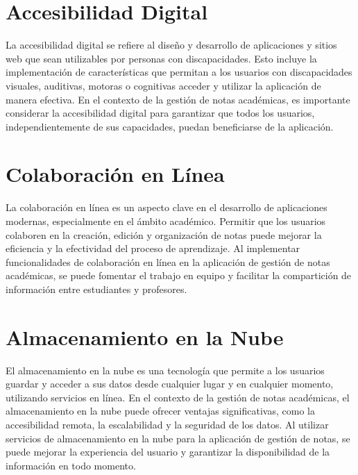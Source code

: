 \section{Accesibilidad Digital}
La accesibilidad digital se refiere al diseño y desarrollo de aplicaciones y sitios web que sean utilizables por personas con discapacidades. Esto incluye la implementación de características que permitan a los usuarios con discapacidades visuales, auditivas, motoras o cognitivas acceder y utilizar la aplicación de manera efectiva. En el contexto de la gestión de notas académicas, es importante considerar la accesibilidad digital para garantizar que todos los usuarios, independientemente de sus capacidades, puedan beneficiarse de la aplicación.\cite{porto_accesibilidad_2023}

\vspace{1cm}
\section{Colaboración en Línea}
La colaboración en línea es un aspecto clave en el desarrollo de aplicaciones modernas, especialmente en el ámbito académico. Permitir que los usuarios colaboren en la creación, edición y organización de notas puede mejorar la eficiencia y la efectividad del proceso de aprendizaje. Al implementar funcionalidades de colaboración en línea en la aplicación de gestión de notas académicas, se puede fomentar el trabajo en equipo y facilitar la compartición de información entre estudiantes y profesores.\cite{trabajo_colaborativo}    

\vspace{1cm}
\section{Almacenamiento en la Nube}
El almacenamiento en la nube es una tecnología que permite a los usuarios guardar y acceder a sus datos desde cualquier lugar y en cualquier momento, utilizando servicios en línea. En el contexto de la gestión de notas académicas, el almacenamiento en la nube puede ofrecer ventajas significativas, como la accesibilidad remota, la escalabilidad y la seguridad de los datos. Al utilizar servicios de almacenamiento en la nube para la aplicación de gestión de notas, se puede mejorar la experiencia del usuario y garantizar la disponibilidad de la información en todo momento.\cite{almacenamiento_nube}

\vspace{1cm}
